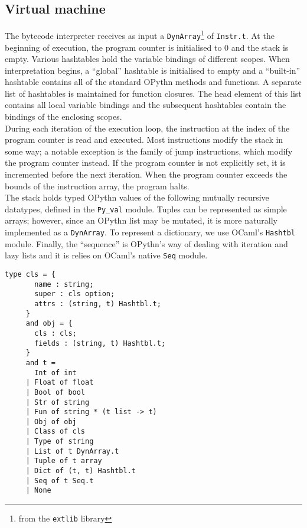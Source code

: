 \documentclass[11pt, twoside]{article}
\newcommand{\ms}{\texttt}
\begin{document}
    \subsection{Virtual machine}
    The bytecode interpreter receives as input a \ms{DynArray}\footnote{from the \ms{extlib} library} of \ms{Instr.t}. At the beginning of execution, the program counter is initialised to 0 and the stack is empty. Various hashtables hold the variable bindings of different scopes. When interpretation begins, a ``global'' hashtable is initialised to empty and a ``built-in'' hashtable contains all of the standard OPythn methods and functions. A separate list of hashtables is maintained for function closures. The head element of this list contains all local variable bindings and the subsequent hashtables contain the bindings of the enclosing scopes.\\
    \indent During each iteration of the execution loop, the instruction at the index of the program counter is read and executed. Most instructions modify the stack in some way; a notable exception is the family of jump instructions, which modify the program counter instead. If the program counter is not explicitly set, it is incremented before the next iteration. When the program counter exceeds the bounds of the instruction array, the program halts.\\
    \indent The stack holds typed OPythn values of the following mutually recursive datatypes, defined in the \ms{Py\_val} module. Tuples can be represented as simple arrays; however, since an OPythn list may be mutated, it is more naturally implemented as a \ms{DynArray}. To represent a dictionary, we use OCaml's \ms{Hashtbl} module. Finally, the ``sequence'' is OPythn's way of dealing with iteration and lazy lists and it is relies on OCaml's native \ms{Seq} module.
    \begin{lstlisting}[language=caml]
     type cls = {
       name : string;
       super : cls option;
       attrs : (string, t) Hashtbl.t;
     }
     and obj = {
       cls : cls;
       fields : (string, t) Hashtbl.t;
     }
     and t =
       Int of int
     | Float of float
     | Bool of bool
     | Str of string
     | Fun of string * (t list -> t)
     | Obj of obj
     | Class of cls
     | Type of string
     | List of t DynArray.t
     | Tuple of t array
     | Dict of (t, t) Hashtbl.t
     | Seq of t Seq.t
     | None
    \end{lstlisting}
\end{document}
